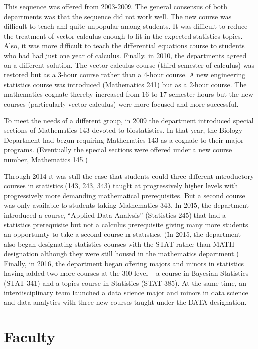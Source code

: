 \documentclass[
]{book}
\begin{document}
This sequence was offered from 2003-2009. The general consensus of both departments was that the sequence did not work well. The new course was difficult to teach and quite unpopular among students. It was difficult to reduce the treatment of vector calculus enough to fit in the expected statistics topics. Also, it was more difficult to teach the differential equations course to students who had had just one year of calculus. Finally, in 2010, the departments agreed on a different solution. The vector calculus course (third semester of calculus) was restored but as a 3-hour course rather than a 4-hour course. A new engineering statistics course was introduced (Mathematics 241) but as a 2-hour course. The mathematics cognate thereby increased from 16 to 17 semester hours but the new courses (particularly vector calculus) were more focused and more successful.

To meet the needs of a different group, in 2009 the department introduced special sections of Mathematics 143 devoted to biostatistics. In that year, the Biology Department had begun requiring Mathematics 143 as a cognate to their major programs. (Eventually the special sections were offered under a new course number, Mathematics 145.)

Through 2014 it was still the case that students could three different introductory courses in statistics (143, 243, 343) taught at progressively higher levels with progressively more demanding mathematical prerequisites. But a second course was only available to students taking Mathematics 343. In 2015, the department introduced a course, ``Applied Data Analysis'' (Statistics 245) that had a statistics prerequisite but not a calculus prerequisite giving many more students an opportunity to take a second course in statistics. (In 2015, the department also began designating statistics courses with the STAT rather than MATH designation although they were still housed in the mathematics department.) Finally, in 2016, the department began offering majors and minors in statistics having added two more courses at the 300-level -- a course in Bayesian Statistics (STAT 341) and a topics course in Statistics (STAT 385). At the same time, an interdisciplinary team launched a data science major and minors in data science and data analytics with three new courses taught under the DATA designation.

\hypertarget{faculty}{%
\section{Faculty}\label{faculty}}
\end{document}
